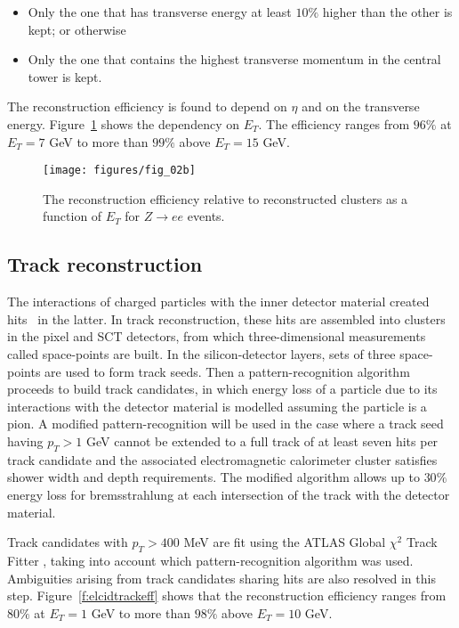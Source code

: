 \begin{itemize}

	\item Only the one that has transverse energy at least $10\%$ higher than the
	      other is kept; or otherwise

	\item Only the one that contains the highest transverse momentum in the central
	      tower is kept.

\end{itemize}

The reconstruction efficiency is found to depend on $\eta$ and on the
transverse energy. Figure~\ref{f:elcidseed} shows the dependency on $E_T$.
The efficiency ranges from $96\%$ at $E_T = 7$ GeV to more than $99\%$
above $E_T = 15$ GeV.


\begin{figure}[h]
	\texttt{[image: figures/fig\_02b]}
	\centering

	\caption{The reconstruction efficiency relative to reconstructed clusters
		as a function of $E_T$ for $Z\to ee$ events.}

	\label{f:elcidseed}

\end{figure}

\subsection{Track reconstruction}

The interactions of charged particles with the inner detector material created
hits~\cite{eltrackhits} in the latter. In track reconstruction, these hits are
assembled into clusters in the pixel and SCT detectors, from which
three-dimensional measurements called space-points are built. In the
silicon-detector layers, sets of three space-points are used to form track
seeds. Then a pattern-recognition algorithm proceeds to build track candidates,
in which energy loss of a particle due to its interactions with the detector
material is modelled assuming the particle is a pion. A modified
pattern-recognition will be used in the case where a track seed having $p_T >
	1$ GeV cannot be extended to a full track of at least seven hits per track
candidate and the associated electromagnetic calorimeter cluster satisfies
shower width and depth requirements. The modified algorithm allows up to $30\%$
energy loss for bremsstrahlung at each intersection of the track with the
detector material.

Track candidates with $p_T > 400$ MeV are fit using the ATLAS Global $\chi^2$
Track Fitter \cite{globalchisqfit}, taking into account which
pattern-recognition algorithm was used. Ambiguities arising from track
candidates sharing hits are also resolved in this step.
Figure~\ref{f:elcidtrackeff} shows that the reconstruction efficiency ranges
from $80\%$ at $E_T=1$ GeV to more than $98\%$ above $E_T = 10$ GeV.

